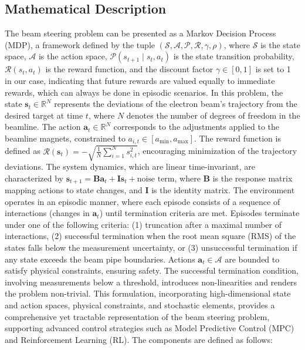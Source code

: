 \documentclass[journal,article,submit,pdftex,moreauthors]{Definitions/mdpi}
\begin{document}
\subsection{Mathematical Description}
The beam steering problem can be presented as a Markov Decision Process (MDP), a framework defined by the tuple $(\mathcal{S}, \mathcal{A}, \mathcal{P}, \mathcal{R}, \gamma, \rho)$, where $\mathcal{S}$ is the state space, $\mathcal{A}$ is the action space, $\mathcal{P}(s_{t+1} \mid s_t, a_t)$ is the state transition probability, $\mathcal{R}(s_t, a_t)$ is the reward function, and the discount factor $\gamma \in [0,1]$  is set to 1 in our case, indicating that future rewards are valued equally to immediate rewards, which can always be done in episodic scenarios. In this problem, the state $\mathbf{s}_t \in \mathbb{R}^N$ represents the deviations of the electron beam's trajectory from the desired target at time $t$, where $N$ denotes the number of degrees of freedom in the beamline. The action $\mathbf{a}_t \in \mathbb{R}^N$ corresponds to the adjustments applied to the beamline magnets, constrained to $a_{i,t} \in [a_{\text{min}}, a_{\text{max}}]$. The reward function is defined as $\mathcal{R}(\mathbf{s}_t) = -\sqrt{\frac{1}{N} \sum_{i=1}^N s_{i,t}^2}$, encouraging minimization of the trajectory deviations. The system dynamics, which are linear time-invariant, are characterized by $\mathbf{s}_{t+1} = \mathbf{B} \mathbf{a}_t + \mathbf{I} \mathbf{s}_t + \text{noise term}$, where $\mathbf{B}$ is the response matrix mapping actions to state changes, and $\mathbf{I}$ is the identity matrix. The environment operates in an episodic manner, where each episode consists of a sequence of interactions (changes in $\mathbf{a}_t$) until termination criteria are met. Episodes terminate under one of the following criteria: (1) truncation after a maximal number of interactions, (2) successful termination when the root mean square (RMS) of the states falls below the measurement uncertainty, or (3) unsuccessful termination if any state exceeds the beam pipe boundaries. Actions $\mathbf{a}_t \in \mathcal{A}$ are bounded to satisfy physical constraints, ensuring safety. The successful termination condition, involving measurements below a threshold, introduces non-linearities and renders the problem non-trivial. This formulation, incorporating high-dimensional state and action spaces, physical constraints, and stochastic elements, provides a comprehensive yet tractable representation of the beam steering problem, supporting advanced control strategies such as Model Predictive Control (MPC) and Reinforcement Learning (RL).
The components are defined as follows:
\end{document}
